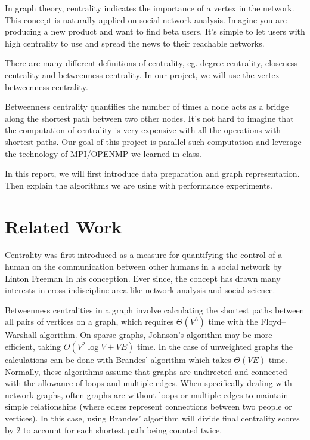 \documentclass[11pt,a4paper,titlepage]{article}
\begin{document}
In graph theory, centrality indicates the importance of a vertex in the
network. This concept is naturally applied on social network analysis. Imagine
you are producing a new product and want to find beta users. It's simple to let
users with high centrality to use and spread the news to their reachable
networks.

There are many different definitions of centrality, eg. degree centrality,
closeness centrality and betweenness centrality. In our project, we will use
the vertex betweenness centrality.

Betweenness centrality quantifies the number of times a node acts as a bridge
along the shortest path between two other nodes. It's not hard to imagine that
the computation of centrality is very expensive with all the operations with
shortest paths. Our goal of this project is parallel such computation and
leverage the technology of MPI/OPENMP we learned in class.

In this report, we will first introduce data preparation and graph
representation. Then explain the algorithms we are using with performance
experiments.



\section{Related Work} %
\label{sec:related-work}

Centrality was first introduced as a measure for quantifying the control of a
human on the communication between other humans in a social network by Linton
Freeman\cite{burt2009structural} In his conception. Ever since, the concept has
drawn many interests in cross-indiscipline area like network analysis and
social science.

Betweenness centralities in a graph involve calculating the shortest paths
between all pairs of vertices on a graph, which requires $\Theta(V^3)$ time
with the Floyd–Warshall\cite{Cormen:2001:IA:580470} algorithm. On sparse
graphs, Johnson's\cite{johnson1977efficient} algorithm may be more efficient,
taking $O(V^2 \log V + V E)$ time. In the case of unweighted graphs the
calculations can be done with Brandes' algorithm\cite{brandes2001faster} which
takes $\Theta(VE)$ time. Normally, these algorithms assume that graphs are
undirected and connected with the allowance of loops and multiple edges. When
specifically dealing with network graphs, often graphs are without loops or
multiple edges to maintain simple relationships (where edges represent
connections between two people or vertices). In this case, using Brandes'
algorithm will divide final centrality scores by 2 to account for each shortest
path being counted twice.
\end{document}
